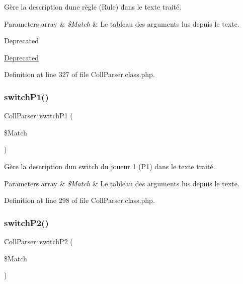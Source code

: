 Gère la description d\textquotesingle{}une règle (Rule) dans le texte traité.


\begin{DoxyParams}[1]{Parameters}
array & {\em \$\+Match} & Le tableau des arguments lus depuis le texte. \\
\hline
\end{DoxyParams}
\begin{DoxyRefDesc}{Deprecated}
\item[\hyperlink{deprecated__deprecated000015}{Deprecated}]\end{DoxyRefDesc}


Definition at line 327 of file Coll\+Parser.\+class.\+php.

\mbox{\label{class_coll_parser_a69196772c6fbb721c22080ab82e1ea7a}} 
\subsubsection{\texorpdfstring{switch\+P1()}{switchP1()}}
{\footnotesize\ttfamily Coll\+Parser\+::switch\+P1 (\begin{DoxyParamCaption}\item[{}]{\$\+Match }\end{DoxyParamCaption})\hspace{0.3cm}{\ttfamily [protected]}}

Gère la description d\textquotesingle{}un switch du joueur 1 (P1) dans le texte traité.


\begin{DoxyParams}[1]{Parameters}
array & {\em \$\+Match} & Le tableau des arguments lus depuis le texte. \\
\hline
\end{DoxyParams}


Definition at line 298 of file Coll\+Parser.\+class.\+php.

\mbox{\label{class_coll_parser_ab14ed8fd90b3a58b7589d0e46057fc06}} 
\subsubsection{\texorpdfstring{switch\+P2()}{switchP2()}}
{\footnotesize\ttfamily Coll\+Parser\+::switch\+P2 (\begin{DoxyParamCaption}\item[{}]{\$\+Match }\end{DoxyParamCaption})\hspace{0.3cm}{\ttfamily [protected]}}

